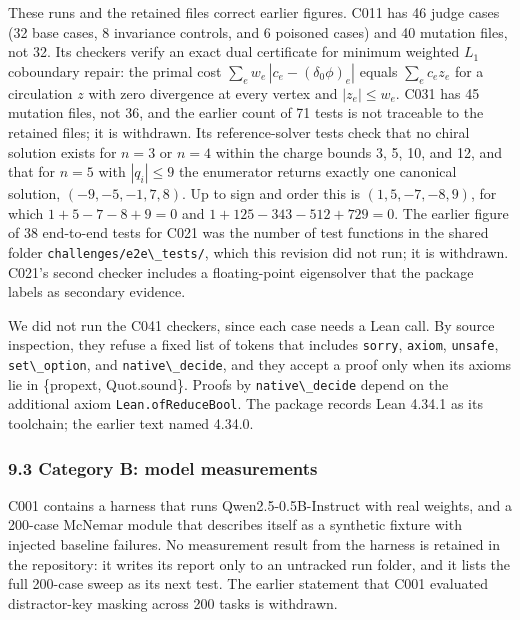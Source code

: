 \documentclass[
  11pt,
]{article}
\newcommand{\passthrough}[1]{#1}
\begin{document}
These runs and the retained files correct earlier figures. C011 has 46
judge cases (32 base cases, 8 invariance controls, and 6 poisoned cases)
and 40 mutation files, not 32. Its checkers verify an exact dual
certificate for minimum weighted \(L_1\) coboundary repair: the primal
cost \(\sum_e w_e\,|c_e-(\delta_0\phi)_e|\) equals \(\sum_e c_e z_e\)
for a circulation \(z\) with zero divergence at every vertex and
\(|z_e|\le w_e\). C031 has 45 mutation files, not 36, and the earlier
count of 71 tests is not traceable to the retained files; it is
withdrawn. Its reference-solver tests check that no chiral solution
exists for \(n=3\) or \(n=4\) within the charge bounds 3, 5, 10, and 12,
and that for \(n=5\) with \(|q_i|\le 9\) the enumerator returns exactly
one canonical solution, \((-9,-5,-1,7,8)\). Up to sign and order this is
\((1,5,-7,-8,9)\), for which \(1+5-7-8+9=0\) and
\(1+125-343-512+729=0\). The earlier figure of 38 end-to-end tests for
C021 was the number of test functions in the shared folder
\passthrough{\lstinline!challenges/e2e\_tests/!}, which this revision
did not run; it is withdrawn. C021's second checker includes a
floating-point eigensolver that the package labels as secondary
evidence.

We did not run the C041 checkers, since each case needs a Lean call. By
source inspection, they refuse a fixed list of tokens that includes
\passthrough{\lstinline!sorry!}, \passthrough{\lstinline!axiom!},
\passthrough{\lstinline!unsafe!}, \passthrough{\lstinline!set\_option!},
and \passthrough{\lstinline!native\_decide!}, and they accept a proof
only when its axioms lie in \{propext, Quot.sound\}. Proofs by
\passthrough{\lstinline!native\_decide!} depend on the additional axiom
\passthrough{\lstinline!Lean.ofReduceBool!}. The package records Lean
4.34.1 as its toolchain; the earlier text named 4.34.0.

\hypertarget{category-b-model-measurements}{%
\subsubsection{9.3 Category B: model
measurements}\label{category-b-model-measurements}}

C001 contains a harness that runs Qwen2.5-0.5B-Instruct with real
weights, and a 200-case McNemar module that describes itself as a
synthetic fixture with injected baseline failures. No measurement result
from the harness is retained in the repository: it writes its report
only to an untracked run folder, and it lists the full 200-case sweep as
its next test. The earlier statement that C001 evaluated distractor-key
masking across 200 tasks is withdrawn.
\end{document}
